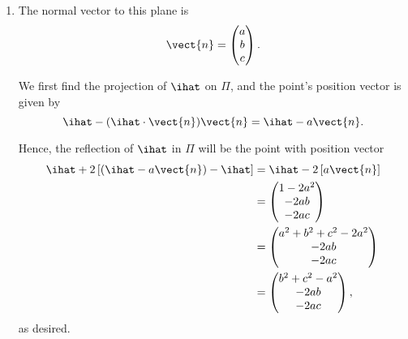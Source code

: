 \begin{enumerate}
    \item The normal vector to this plane is
          \[
              \vect{n} = \begin{pmatrix}
                  a \\
                  b \\
                  c
              \end{pmatrix}.
          \]

          We first find the projection of \(\ihat\) on \(\Pi\), and the point's position vector is given by
          \[
              \ihat - (\ihat \cdot \vect{n}) \vect{n} = \ihat - a \vect{n}.
          \]

          Hence, the reflection of \(\ihat\) in \(\Pi\) will be the point with position vector
          \begin{align*}
              \ihat + 2 \left[\left(\ihat - a \vect{n}\right) - \ihat\right] & = \ihat - 2 \left[a \vect{n}\right] \\
                                                                             & = \begin{pmatrix}
                                                                                     1 - 2a^2 \\
                                                                                     -2ab     \\
                                                                                     -2ac
                                                                                 \end{pmatrix}                    \\
                                                                             & = \begin{pmatrix}
                                                                                     a^2 + b^2 + c^2 - 2a^2 \\
                                                                                     -2ab                   \\
                                                                                     -2ac
                                                                                 \end{pmatrix}            \\
                                                                             & = \begin{pmatrix}
                                                                                     b^2 + c^2 - a^2 \\
                                                                                     -2ab            \\
                                                                                     -2ac
                                                                                 \end{pmatrix},
          \end{align*}
          as desired.


\end{enumerate}
